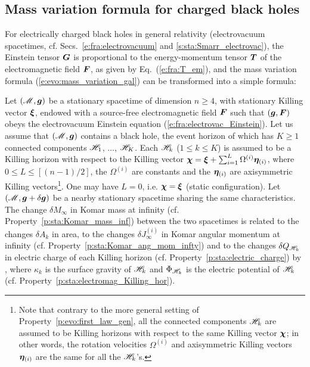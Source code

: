 \subsection{Mass variation formula for charged black holes}

For electrically charged black holes in general relativity
(electrovacuum spacetimes, cf. Secs.~\ref{e:fra:electrovacuum} and \ref{s:sta:Smarr_electrovac}),
the Einstein tensor $\bm{G}$ is proportional to the energy-momentum tensor
$\bm{T}$ of the electromagnetic field $\bm{F}$, as given by Eq.~(\ref{e:fra:T_em}),
and the mass variation formula (\ref{e:evo:mass_variation_gal}) can be transformed
into a simple formula:

\begin{prop}
\label{p:evo:mass_var_electrovac}
Let $(\mathscr{M},\bm{g})$ be a stationary spacetime of dimension $n\geq 4$, with stationary
Killing vector $\bm{\xi}$, endowed with a source-free electromagnetic field
$\bm{F}$ such that $(\bm{g},\bm{F})$ obeys the electrovacuum Einstein equation
(\ref{e:fra:electrovac_Einstein}).
Let us assume that $(\mathscr{M},\bm{g})$ contains a black
hole, the event horizon of which has $K \geq 1$ connected components
$\mathscr{H}_{1}$, $\ldots$, $\mathscr{H}_{K}$. Each $\mathscr{H}_{k}$ ($1\leq k \leq K$)
is assumed to be a Killing horizon with respect to the Killing vector
$\bm{\chi} = \bm{\xi} + \sum_{i=1}^{L} \Omega^{(i)} \bm{\eta}_{(i)}$,
where $0\leq L \leq [(n-1)/2]$, the $\Omega^{(i)}$ are constants and
the $\bm{\eta}_{(i)}$ are axisymmetric Killing vectors\footnote{Note that contrary to the more
general setting of Property~\ref{p:evo:first_law_gen},
all the connected components $\mathscr{H}_k$ are assumed to be Killing horizons with
respect to the same Killing vector $\bm{\chi}$; in other words, the
rotation velocities
$\Omega^{(i)}$ and axisymmetric Killing vectors $\bm{\eta}_{(i)}$
are the same for all the $\mathscr{H}_k$'s.}. One may have $L=0$,
i.e. $\bm{\chi} = \bm{\xi}$ (static configuration).
Let $(\mathscr{M},\bm{g}+\delta\bm{g})$ be a nearby stationary spacetime sharing the same characteristics.
The change $\delta M_\infty$ in Komar mass at infinity
(cf. Property~\ref{p:sta:Komar_mass_inf}) between the two spacetimes
is related to the changes $\delta A_k$ in area, to the changes
$\delta J_{\infty}^{(i)}$ in Komar angular momentum at infinity
(cf. Property~\ref{p:sta:Komar_ang_mom_infty})
and to the changes $\delta Q_{\mathscr{H}_k}$ in electric
charge of each Killing horizon (cf. Property~\ref{p:sta:electric_charge})
by
\be \label{e:evo:mass_variation_electovac}
     ,
\ee
where $\kappa_k$ is the surface gravity of $\mathscr{H}_k$ and $\Phi_{\mathscr{H}_k}$
is the electric potential of $\mathscr{H}_k$ (cf. Property~\ref{p:sta:electromag_Killing_hor}).


\end{prop}
